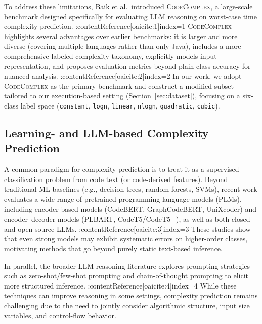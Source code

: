 \documentclass[conference]{IEEEtran}
\begin{document}
 To address these limitations, Baik et al.\ introduced \textsc{CodeComplex}, a large-scale benchmark designed 
 specifically for evaluating LLM reasoning on worst-case time complexity prediction. :contentReference[oaicite:1]{index=1} 
 \textsc{CodeComplex} highlights several advantages over earlier benchmarks: it is larger and more diverse (covering 
 multiple languages rather than only Java), includes a more comprehensive labeled complexity taxonomy, explicitly 
 models input representation, and proposes evaluation metrics beyond plain class accuracy for nuanced analysis. :contentReference[oaicite:2]{index=2} 
 In our work, we adopt \textsc{CodeComplex} as the primary benchmark and construct a modified subset tailored to our 
 execution-based setting (Section~\ref{sec:dataset}), focusing on a six-class label space 
 (\texttt{constant}, \texttt{logn}, \texttt{linear}, \texttt{nlogn}, \texttt{quadratic}, \texttt{cubic}). 
 
 \subsection{Learning- and LLM-based Complexity Prediction} 
 A common paradigm for complexity prediction is to treat it as a supervised classification problem from code text 
 (or code-derived features). Beyond traditional ML baselines (e.g., decision trees, random forests, SVMs), 
 recent work evaluates a wide range of pretrained programming language models (PLMs), including encoder-based models 
 (CodeBERT, GraphCodeBERT, UniXcoder) and encoder--decoder models (PLBART, CodeT5/CodeT5+), as well as both closed- 
 and open-source LLMs. :contentReference[oaicite:3]{index=3} 
 These studies show that even strong models may exhibit systematic errors on higher-order classes, motivating methods 
 that go beyond purely static text-based inference. 
 
 In parallel, the broader LLM reasoning literature explores prompting strategies such as zero-shot/few-shot prompting 
 and chain-of-thought prompting to elicit more structured inference. :contentReference[oaicite:4]{index=4} 
 While these techniques can improve reasoning in some settings, complexity prediction remains challenging due to the 
 need to jointly consider algorithmic structure, input size variables, and control-flow behavior. 
 
\end{document}
